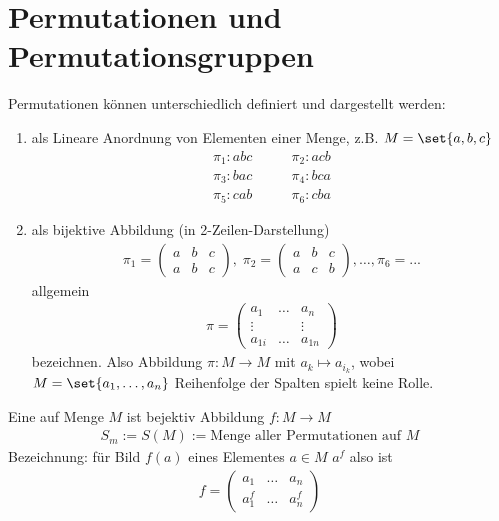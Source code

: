 \section{Permutationen und Permutationsgruppen}
Permutationen können unterschiedlich definiert und dargestellt werden:
\begin{enumerate}
	\item als Lineare Anordnung von Elementen einer Menge, z.B. $M = \set{a,b,c}$
	\begin{align*}
		\pi_1\colon abc &\qquad \pi_2 \colon acb\\
		\pi_3 \colon bac &\qquad \pi_4 \colon bca\\
		\pi_5 \colon cab &\qquad \pi_6\colon cba
	\end{align*}
	\item als bijektive Abbildung (in 2-Zeilen-Darstellung)
	\begin{align*}
		\pi_1 = \begin{pmatrix}
			a & b & c\\
			a & b & c
		\end{pmatrix},\;
	\pi_2 = \begin{pmatrix}
		a & b & c\\
		a & c & b
	\end{pmatrix}, \dots, \pi_6 = ...
	\end{align*}
	allgemein
	\begin{align*}
		\pi = \begin{pmatrix}
			a_1 & \dots &a_n\\
			\vdots & & \vdots\\
			a_{1i} & \dots & a_{1n}
		\end{pmatrix}
	\end{align*}
	bezeichnen. Also Abbildung $\pi \colon M \to M$ mit $a_k \mapsto a_{i_k}$, wobei $M = \set{a_1, \dots, a_n}$ Reihenfolge der Spalten spielt keine Rolle.
\end{enumerate}
\begin{definition}
	Eine  auf Menge $M$ ist bejektiv Abbildung $f \colon M \to M$
	\begin{align*}
		S_m := S(M) := \text{Menge aller Permutationen auf }M
	\end{align*}
	Bezeichnung: für Bild $f(a)$ eines Elementes $a \in M$ $a^f$ also ist
	\begin{align*}
		f = \begin{pmatrix}
			a_1 & \dots & a_n\\
			a^f_1 &\dots & a^f_n
		\end{pmatrix}
	\end{align*}
\end{definition}
